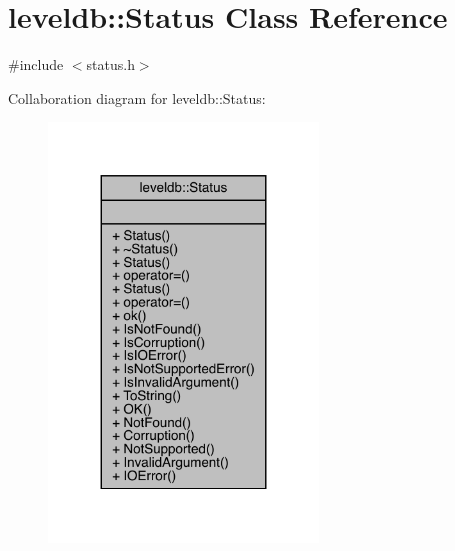 \hypertarget{classleveldb_1_1_status}{}\section{leveldb\+::Status Class Reference}
\label{classleveldb_1_1_status}


{\ttfamily \#include $<$status.\+h$>$}



Collaboration diagram for leveldb\+::Status\+:
\nopagebreak
\begin{figure}[H]
\begin{center}
\leavevmode
\includegraphics[width=203pt]{classleveldb_1_1_status__coll__graph}
\end{center}
\end{figure}
